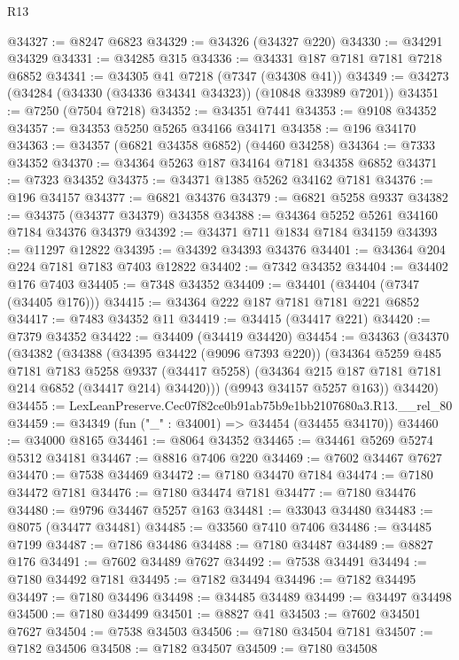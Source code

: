 \begin{lexlean}{R13}
\begin{coremodule}
@34327 := @8247 @6823
@34329 := @34326 (@34327 @220)
@34330 := @34291 @34329
@34331 := @34285 @315
@34336 := @34331 @187 @7181 @7181 @7218 @6852
@34341 := @34305 @41 @7218 (@7347 (@34308 @41))
@34349 := @34273 (@34284 (@34330 (@34336 @34341 @34323)) (@10848 @33989 @7201))
@34351 := @7250 (@7504 @7218)
@34352 := @34351 @7441
@34353 := @9108 @34352
@34357 := @34353 @5250 @5265 @34166 @34171
@34358 := @196 @34170
@34363 := @34357 (@6821 @34358 @6852) (@4460 @34258)
@34364 := @7333 @34352
@34370 := @34364 @5263 @187 @34164 @7181 @34358 @6852
@34371 := @7323 @34352
@34375 := @34371 @1385 @5262 @34162 @7181
@34376 := @196 @34157
@34377 := @6821 @34376
@34379 := @6821 @5258 @9337
@34382 := @34375 (@34377 @34379) @34358
@34388 := @34364 @5252 @5261 @34160 @7184 @34376 @34379
@34392 := @34371 @711 @1834 @7184 @34159
@34393 := @11297 @12822
@34395 := @34392 @34393 @34376
@34401 := @34364 @204 @224 @7181 @7183 @7403 @12822
@34402 := @7342 @34352
@34404 := @34402 @176 @7403
@34405 := @7348 @34352
@34409 := @34401 (@34404 (@7347 (@34405 @176)))
@34415 := @34364 @222 @187 @7181 @7181 @221 @6852
@34417 := @7483 @34352 @11
@34419 := @34415 (@34417 @221)
@34420 := @7379 @34352
@34422 := @34409 (@34419 @34420)
@34454 := @34363
    (@34370
      (@34382
        (@34388
          (@34395 @34422 (@9096 @7393 @220))
          (@34364
            @5259
            @485
            @7181
            @7183
            @5258
            @9337
            (@34417 @5258)
            (@34364 @215 @187 @7181 @7181 @214 @6852 (@34417 @214) @34420)))
        (@9943 @34157 @5257 @163))
      @34420)
@34455 := LexLeanPreserve.Cec07f82ce0b91ab75b9e1bb2107680a3.R13.__rel_80
@34459 := @34349 (fun ("_" : @34001) => @34454 (@34455 @34170))
@34460 := @34000 @8165
@34461 := @8064 @34352
@34465 := @34461 @5269 @5274 @5312 @34181
@34467 := @8816 @7406 @220
@34469 := @7602 @34467 @7627
@34470 := @7538 @34469
@34472 := @7180 @34470 @7184
@34474 := @7180 @34472 @7181
@34476 := @7180 @34474 @7181
@34477 := @7180 @34476
@34480 := @9796 @34467 @5257 @163
@34481 := @33043 @34480
@34483 := @8075 (@34477 @34481)
@34485 := @33560 @7410 @7406
@34486 := @34485 @7199
@34487 := @7186 @34486
@34488 := @7180 @34487
@34489 := @8827 @176
@34491 := @7602 @34489 @7627
@34492 := @7538 @34491
@34494 := @7180 @34492 @7181
@34495 := @7182 @34494
@34496 := @7182 @34495
@34497 := @7180 @34496
@34498 := @34485 @34489
@34499 := @34497 @34498
@34500 := @7180 @34499
@34501 := @8827 @41
@34503 := @7602 @34501 @7627
@34504 := @7538 @34503
@34506 := @7180 @34504 @7181
@34507 := @7182 @34506
@34508 := @7182 @34507
@34509 := @7180 @34508

\end{coremodule}
\end{lexlean}
